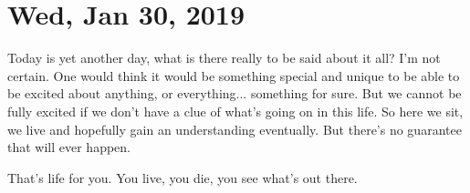 \section{Wed, Jan 30, 2019}

Today is yet another day, what is there really to be said about it all? I'm not certain.
One would think it would be something special and unique to be able to be excited about
anything, or everything... something for sure. But we cannot be fully excited if we don't
have a clue of what's going on in this life. So here we sit, we live and hopefully gain
an understanding eventually. But there's no guarantee that will ever happen.

That's life for you. You live, you die, you see what's out there.
